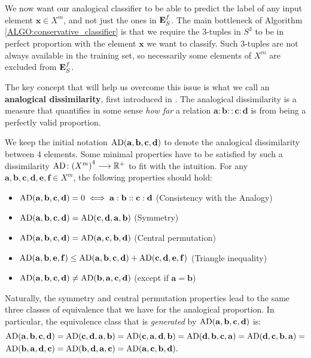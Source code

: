 We now want our analogical classifier to be able to predict the label of any
input element $\mathbf{x} \in X^m$, and not just the ones in $\mathbf{E}_{S}^{f}$.
The main bottleneck of Algorithm \ref{ALGO:conservative_classifier} is that we
require the 3-tuples in $S^3$ to be in perfect proportion with the element
$\mathbf{x}$ we want to classify. Such 3-tuples are not always available in the
training set, so necessarily some elements of $X^m$ are excluded from $\mathbf{E}_{S}^{f}$.

The key concept that will help us overcome this issue is what we call an
\textbf{analogical dissimilarity}, first introduced in
\cite{BayMicDelIJCAI07}. The analogical dissimilarity is a measure that
quantifies in some sense \textit{how far} a relation $\mathbf{a} : \mathbf{b}
:: \mathbf{c} : \mathbf{d}$ is from being a perfectly valid proportion.

We keep the initial notation $\text{AD}(\mathbf{a}, \mathbf{b},
\mathbf{c},\mathbf{d})$ to denote the analogical dissimilarity between 4
elements.  Some  minimal properties have to be satisfied by such a
dissimilarity $\text{AD} \colon {(X^m)}^4 \longrightarrow \mathbb{R}^+$ to fit
with the intuition. For any $\mathbf{a}, \mathbf{b},\mathbf{c},\mathbf{d},
\mathbf{e}, \mathbf{f} \in X^m$, the following properties should hold:
\begin{itemize}
  \item $\text{AD}(\mathbf{a}, \mathbf{b},\mathbf{c},\mathbf{d})=0 \iff \mathbf{a} :
    \mathbf{b}:: \mathbf{c} : \mathbf{d}$ (Consistency with the Analogy)
  \item $\text{AD}(\mathbf{a}, \mathbf{b},\mathbf{c},\mathbf{d})=
    \text{AD}(\mathbf{c}, \mathbf{d},\mathbf{a},\mathbf{b})$ (Symmetry)
  \item $\text{AD}(\mathbf{a}, \mathbf{b},\mathbf{c},\mathbf{d})=
    \text{AD}(\mathbf{a}, \mathbf{c},\mathbf{b},\mathbf{d})$ (Central permutation)
  \item $\text{AD}(\mathbf{a}, \mathbf{b},\mathbf{e},\mathbf{f}) \leq \text{AD}(\mathbf{a},
    \mathbf{b},\mathbf{c},\mathbf{d}) + \text{AD}(\mathbf{c},
    \mathbf{d},\mathbf{e},\mathbf{f})$ (Triangle inequality)
  \item $\text{AD}(\mathbf{a}, \mathbf{b},\mathbf{c},\mathbf{d}) \neq \text{AD}(\mathbf{b},
    \mathbf{a},\mathbf{c},\mathbf{d})$ (except if $\mathbf{a}= \mathbf{b}$)
\end{itemize}
Naturally, the symmetry and central permutation properties lead to the same
three classes of equivalence that we have for the analogical proportion. In
particular, the equivalence class that is \textit{generated} by
$\text{AD}(\mathbf{a}, \mathbf{b},\mathbf{c},\mathbf{d})$ is:
\begin{align*}
  &\text{AD}(\mathbf{a}, \mathbf{b},\mathbf{c},\mathbf{d}) =
\text{AD}(\mathbf{c}, \mathbf{d},\mathbf{a},\mathbf{b})=
\text{AD}(\mathbf{c}, \mathbf{a},\mathbf{d},\mathbf{b})=
\text{AD}(\mathbf{d}, \mathbf{b},\mathbf{c},\mathbf{a})=
\text{AD}(\mathbf{d}, \mathbf{c},\mathbf{b},\mathbf{a})=\\
  &\text{AD}(\mathbf{b}, \mathbf{a},\mathbf{d},\mathbf{c})=
\text{AD}(\mathbf{b}, \mathbf{d},\mathbf{a},\mathbf{c})=
\text{AD}(\mathbf{a}, \mathbf{c},\mathbf{b},\mathbf{d}).
\end{align*}

